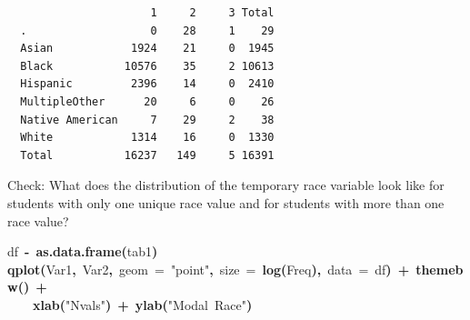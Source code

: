 \documentclass[12pt]{article}
\makeatletter
\newcommand{\hlfunctioncall}[1]{\textcolor[rgb]{0.501960784313725,0,0.329411764705882}{\textbf{#1}}}%
\newcommand{\hlstring}[1]{\textcolor[rgb]{0.6,0.6,1}{#1}}%
\newcommand{\hlkeyword}[1]{\textcolor[rgb]{0,0,0}{\textbf{#1}}}%
\newcommand{\hlargument}[1]{\textcolor[rgb]{0.690196078431373,0.250980392156863,0.0196078431372549}{#1}}%
\newcommand{\hlassignement}[1]{\textcolor[rgb]{0,0,0}{\textbf{#1}}}%
\newcommand{\hlsymbol}[1]{\textcolor[rgb]{0,0,0}{#1}}%
\newcommand{\hlstd}[1]{\textcolor[rgb]{0,0,0}{#1}}%
\newenvironment{kframe}{%
 \def\FrameCommand##1{\hskip\@totalleftmargin \hskip-\fboxsep
 \colorbox{shadecolor}{##1}\hskip-\fboxsep
     \hskip-\linewidth \hskip-\@totalleftmargin \hskip\columnwidth}%
 \MakeFramed {\advance\hsize-\width
   \@totalleftmargin\z@ \linewidth\hsize
   \@setminipage}}%
 {\par\unskip\endMakeFramed}
\newenvironment{knitrout}{}{} %
\renewenvironment{knitrout}{\begin{footnotesize}}{\end{footnotesize}}
\makeatother
\begin{document}
\begin{knitrout}
\begin{kframe}
\begin{verbatim}
                      1     2     3 Total
  .                   0    28     1    29
  Asian            1924    21     0  1945
  Black           10576    35     2 10613
  Hispanic         2396    14     0  2410
  MultipleOther      20     6     0    26
  Native American     7    29     2    38
  White            1314    16     0  1330
  Total           16237   149     5 16391
\end{verbatim}
\end{kframe}
\end{knitrout}


Check:  What does the distribution of the temporary race variable look like for students with only one unique race value and for 
students with more than one race value?

\begin{knitrout}
\color{fgcolor}\begin{kframe}
\begin{flushleft}
\ttfamily\noindent
\hlsymbol{df}{\ }\hlassignement{\usebox{\hlnormalsizeboxlessthan}-}{\ }\hlfunctioncall{as.data.frame}\hlkeyword{(}\hlsymbol{tab1}\hlkeyword{)}\hspace*{\fill}\\
\hlstd{}\hlfunctioncall{qplot}\hlkeyword{(}\hlsymbol{Var1}\hlkeyword{,}{\ }\hlsymbol{Var2}\hlkeyword{,}{\ }\hlargument{geom}{\ }\hlargument{=}{\ }\hlstring{"{}point"{}}\hlkeyword{,}{\ }\hlargument{size}{\ }\hlargument{=}{\ }\hlfunctioncall{log}\hlkeyword{(}\hlsymbol{Freq}\hlkeyword{)}\hlkeyword{,}{\ }\hlargument{data}{\ }\hlargument{=}{\ }\hlsymbol{df}\hlkeyword{)}{\ }\hlkeyword{+}{\ }\hlfunctioncall{theme\usebox{\hlnormalsizeboxunderscore}bw}\hlkeyword{(}\hlkeyword{)}{\ }\hlkeyword{+}\hspace*{\fill}\\
\hlstd{}{\ }{\ }{\ }{\ }\hlfunctioncall{xlab}\hlkeyword{(}\hlstring{"{}Nvals"{}}\hlkeyword{)}{\ }\hlkeyword{+}{\ }\hlfunctioncall{ylab}\hlkeyword{(}\hlstring{"{}Modal{\ }Race"{}}\hlkeyword{)}\mbox{}
\normalfont
\end{flushleft}
\end{kframe}\begin{figure}[]



\end{figure}
\end{knitrout}
\end{document}
